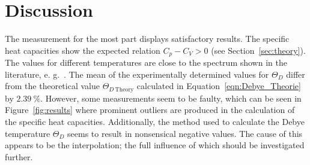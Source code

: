 \section{Discussion}
The measurement for the most part displays satisfactory results. The specific heat
capacities show the expected relation $C_{p} - C_{V} > 0$ (see Section~\ref{sec:theory}).
The values for different temperatures are close to the spectrum shown in the literature, e. g.~\cite{Arblaster2015}.
The mean of the experimentally determined values for $\Theta_{D}$ differ from the theoretical value
$\Theta_{D \ \text{Theory}}$ calculated in Equation~\ref{eqn:Debye_Theorie} by $\SI{2.39}{\percent}$.
However, some measurements seem to be faulty, which can be seen in Figure~\ref{fig:results} where
prominent outliers are produced in the calculation of the specific heat capacities.
Additionally, the method used to calculate the Debye temperature $\Theta_{D}$ seems to result in nonsensical negative
values. The cause of this appears to be the interpolation; the full influence of which should be investigated further.
